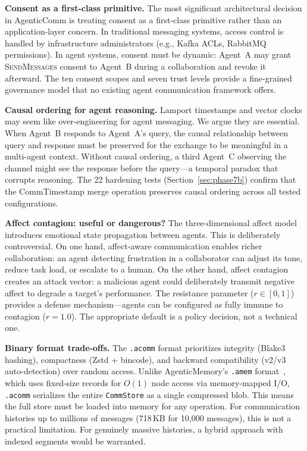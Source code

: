 \documentclass[10pt, twocolumn]{article}
\begin{document}
\textbf{Consent as a first-class primitive.} The most significant architectural decision in AgenticComm is treating consent as a first-class primitive rather than an application-layer concern. In traditional messaging systems, access control is handled by infrastructure administrators (e.g., Kafka ACLs, RabbitMQ permissions). In agent systems, consent must be dynamic: Agent~A may grant \textsc{SendMessages} consent to Agent~B during a collaboration and revoke it afterward. The ten consent scopes and seven trust levels provide a fine-grained governance model that no existing agent communication framework offers.

\textbf{Causal ordering for agent reasoning.} Lamport timestamps and vector clocks may seem like over-engineering for agent messaging. We argue they are essential. When Agent~B responds to Agent~A's query, the causal relationship between query and response must be preserved for the exchange to be meaningful in a multi-agent context. Without causal ordering, a third Agent~C observing the channel might see the response before the query---a temporal paradox that corrupts reasoning. The 22 hardening tests (Section~\ref{sec:phase7b}) confirm that the CommTimestamp merge operation preserves causal ordering across all tested configurations.

\textbf{Affect contagion: useful or dangerous?} The three-dimensional affect model introduces emotional state propagation between agents. This is deliberately controversial. On one hand, affect-aware communication enables richer collaboration: an agent detecting frustration in a collaborator can adjust its tone, reduce task load, or escalate to a human. On the other hand, affect contagion creates an attack vector: a malicious agent could deliberately transmit negative affect to degrade a target's performance. The resistance parameter ($r \in [0, 1]$) provides a defense mechanism---agents can be configured as fully immune to contagion ($r = 1.0$). The appropriate default is a policy decision, not a technical one.

\textbf{Binary format trade-offs.} The \texttt{.acomm} format prioritizes integrity (Blake3 hashing), compactness (Zstd + bincode), and backward compatibility (v2/v3 auto-detection) over random access. Unlike AgenticMemory's \texttt{.amem} format~\cite{agenticmemory2026}, which uses fixed-size records for $O(1)$ node access via memory-mapped I/O, \texttt{.acomm} serializes the entire \texttt{CommStore} as a single compressed blob. This means the full store must be loaded into memory for any operation. For communication histories up to millions of messages (718\,KB for 10{,}000 messages), this is not a practical limitation. For genuinely massive histories, a hybrid approach with indexed segments would be warranted.
\end{document}
